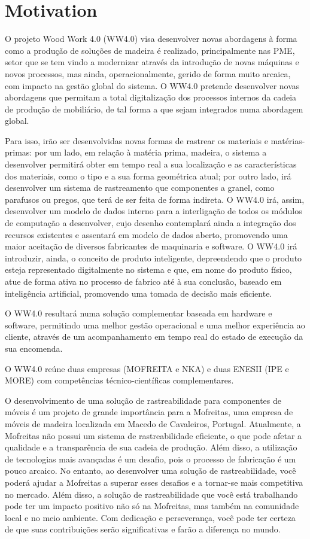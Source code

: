 \section{Motivation}\label{cap:intro:justification}
O projeto Wood Work 4.0 (WW4.0) visa desenvolver novas abordagens à forma como a produção de soluções de madeira é realizado, principalmente nas PME, setor que se tem vindo a modernizar através da introdução de novas máquinas e novos processos, mas ainda, operacionalmente, gerido de forma muito arcaica, com impacto na gestão global do sistema. O WW4.0 pretende desenvolver novas abordagens que permitam a total digitalização dos processos internos da cadeia de produção de mobiliário, de tal forma a que sejam integrados numa abordagem global. 

Para isso, irão ser desenvolvidas novas formas de rastrear os materiais e matérias-primas: por um lado, em relação à matéria prima, madeira, o sistema a desenvolver permitirá obter em tempo real a sua localização e as características dos materiais, como o tipo e a sua forma geométrica atual; por outro lado, irá desenvolver um sistema de rastreamento que componentes a granel, como parafusos ou pregos, que terá de ser feita de forma indireta. O WW4.0 irá, assim, desenvolver um modelo de dados interno para a interligação de todos os módulos de computação a desenvolver, cujo desenho contemplará ainda a integração dos recursos existentes e assentará em modelo de dados aberto, promovendo uma maior aceitação de diversos fabricantes de maquinaria e software. O WW4.0 irá introduzir, ainda, o conceito de produto inteligente, depreendendo que o produto esteja representado digitalmente no sistema e que, em nome do produto físico, atue de forma ativa no processo de fabrico até à sua conclusão, baseado em inteligência artificial, promovendo uma tomada de decisão mais eficiente. 

O WW4.0 resultará numa solução complementar baseada em hardware e software, permitindo uma melhor gestão operacional e uma melhor experiência ao cliente, através de um acompanhamento em tempo real do estado de execução da sua encomenda. 

O WW4.0 reúne duas empresas (MOFREITA e NKA) e duas ENESII (IPE e MORE) com competências técnico-científicas complementares.

O desenvolvimento de uma solução de rastreabilidade para componentes de móveis é um projeto de grande importância para a Mofreitas, uma empresa de móveis de madeira localizada em Macedo de Cavaleiros, Portugal. Atualmente, a Mofreitas não possui um sistema de rastreabilidade eficiente, o que pode afetar a qualidade e a transparência de sua cadeia de produção. Além disso, a utilização de tecnologias mais avançadas é um desafio, pois o processo de fabricação é um pouco arcaico. No entanto, ao desenvolver uma solução de rastreabilidade, você poderá ajudar a Mofreitas a superar esses desafios e a tornar-se mais competitiva no mercado. Além disso, a solução de rastreabilidade que você está trabalhando pode ter um impacto positivo não só na Mofreitas, mas também na comunidade local e no meio ambiente. Com dedicação e perseverança, você pode ter certeza de que suas contribuições serão significativas e farão a diferença no mundo.

